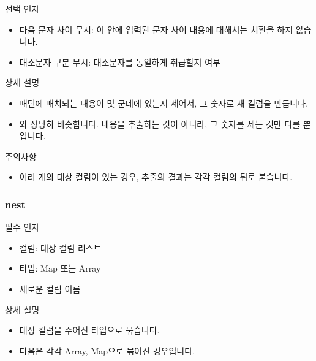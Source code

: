 \documentclass[letterpaper,10pt,english]{sphinxmanual}
\begin{document}
선택 인자
\begin{itemize}
\item {} 
다음 문자 사이 무시: 이 안에 입력된 문자 사이 내용에 대해서는 치환을 하지 않습니다.

\item {} 
대소문자 구분 무시: 대소문자를 동일하게 취급할지 여부

\end{itemize}

상세 설명
\begin{itemize}
\item {} 
패턴에 매치되는 내용이 몇 군데에 있는지 세어서, 그 숫자로 새 컬럼을 만듭니다.

\item {} 
{\hyperref[\detokenize{discovery/part07/rule_kinds:extract}]{}}와 상당히 비슷합니다. 내용을 추출하는 것이 아니라, 그 숫자를 세는 것만 다를 뿐입니다.

\end{itemize}

주의사항
\begin{itemize}
\item {} 
여러 개의 대상 컬럼이 있는 경우, 추출의 결과는 각각 컬럼의 뒤로 붙습니다.

\end{itemize}


\subsubsection{nest}
\label{\detokenize{discovery/part07/rule_kinds:nest}}
필수 인자
\begin{itemize}
\item {} 
컬럼: 대상 컬럼 리스트

\item {} 
타입: Map 또는 Array

\item {} 
새로운 컬럼 이름

\end{itemize}

상세 설명
\begin{itemize}
\item {} 
대상 컬럼을 주어진 타입으로 묶습니다.

\item {} 
다음은 각각 Array, Map으로 묶여진 경우입니다.
\begin{quote}

\begin{figure}[H]
\centering

\noindent{}
\end{figure}
\end{quote}

\end{itemize}
\end{document}
